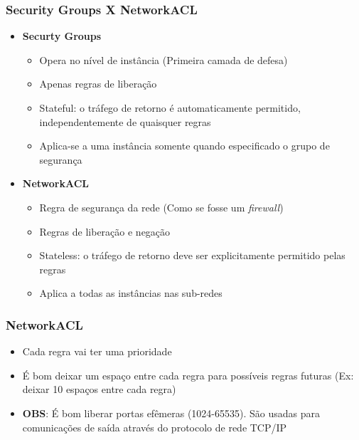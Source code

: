 \begin{frame}
	\frametitle{Security Groups X NetworkACL}
	\begin{itemize}
		\item \textbf{Securty Groups}
		\begin{itemize}
			\item Opera no nível de instância (Primeira camada de defesa)
			\item Apenas regras de liberação
			\item Stateful: o tráfego de retorno é automaticamente permitido, independentemente de quaisquer regras
			\item Aplica-se a uma instância somente quando especificado o grupo de segurança
		\end{itemize}
		\item \textbf{NetworkACL}
		\begin{itemize}
			\item Regra de segurança da rede (Como se fosse um \textit{firewall})
			\item Regras de liberação e negação
			\item Stateless: o tráfego de retorno deve ser explicitamente permitido pelas regras
			\item Aplica a todas as instâncias nas sub-redes
		\end{itemize}
	\end{itemize}
\end{frame}

\begin{frame}
	\frametitle{NetworkACL}
	\begin{itemize}
		\item Cada regra vai ter uma prioridade
		\item É bom deixar um espaço entre cada regra para possíveis regras futuras (Ex: deixar 10 espaços entre cada regra)
		\item \textbf{OBS}: É bom liberar portas efêmeras (1024-65535). São usadas para comunicações de saída através do protocolo de rede TCP/IP
	\end{itemize}
\end{frame}

